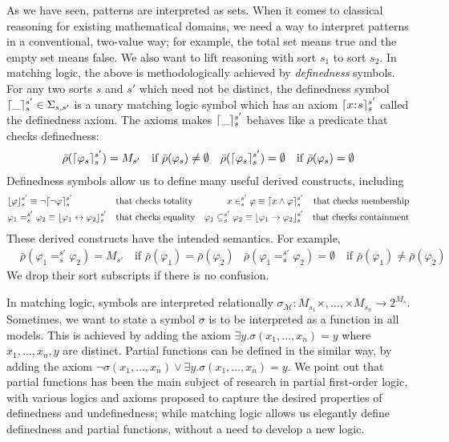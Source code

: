 \documentclass[letter,12pt]{article}
\newcommand{\imp}{\to}
\newcommand{\dimp}{\leftrightarrow}
\newcommand{\ddd}{,\dots,}
\newcommand{\cln}{\mathbin{\!:\!}}
\newcommand{\MM}{\mathcal{M}}
\newcommand{\sigmaM}{{\sigma_{\MM}}}
\newcommand{\SigmaSub}[1]{\Sigma_{#1}}
\newcommand{\barrho}{\bar{\rho}}
\DeclarePairedDelimiter{\ceil}{\lceil}{\rceil}
\DeclarePairedDelimiter{\floor}{\lfloor}{\rfloor}
\begin{document}
As we have seen, patterns are interpreted as sets.
When it comes to classical reasoning for existing mathematical domains,
we need a way to interpret patterns in a conventional, two-value way;
for example, the total set means true and the empty set means false.
We also want to lift reasoning with sort $s_1$ to sort $s_2$.
In matching logic, the above is methodologically achieved by
\emph{definedness} symbols.
For any two sorts $s$ and $s'$ which need not be distinct, 
the definedness symbol
$\ceil{\_}_{s}^{s'} \in \SigmaSub{s,s'}$
is a unary matching logic symbol which has an axiom
$
\ceil{x \cln s}_{s}^{s'}
$
called the definedness axiom. 
The axioms makes $\ceil{\_}_{s}^{s'}$ behaves like a predicate
that checks definedness:
\begin{align*}
& \barrho(\ceil{\varphi_s}_{s}^{s'}) = M_{s'}
  \quad \text{if $\barrho(\varphi_s) \neq \emptyset$}
& \barrho(\ceil{\varphi_s}_{s}^{s'}) = \emptyset
  \quad \text{if $\barrho(\varphi_s) = \emptyset$}
\end{align*}
Definedness symbols allow us to define many useful derived constructs, including
\begin{align*}
&\floor{\varphi}_s^{s'} \equiv \neg \ceil{\neg \varphi}_s^{s'}
&& \text{that checks totality}
&x \in_s^{s'} \varphi \equiv \ceil{x \wedge \varphi}_s^{s'}
&& \text{that checks membership}
\\
&\varphi_1 =_s^{s'} \varphi_2 \equiv \floor{\varphi_1 \dimp \varphi_2}_s^{s'}
&& \text{that checks equality}
&\varphi_1 \subseteq_s^{s'} \varphi_2 
\equiv \floor{\varphi_1 \imp \varphi_2}_s^{s'}
&& \text{that checks containment}
\end{align*}
These derived constructs have the intended semantics.
For example,
\begin{align*}
& \barrho(\varphi_1 =_{s}^{s'} \varphi_2) = M_{s'}
  \quad \text{if $\barrho(\varphi_1) = \barrho(\varphi_2)$}
& \barrho(\varphi_1 =_{s}^{s'} \varphi_2) = \emptyset
  \quad \text{if $\barrho(\varphi_1) \neq \barrho(\varphi_2)$}
\end{align*}
We drop their sort subscripts if there is no confusion.

In matching logic, symbols are interpreted relationally
$\sigmaM \colon M_{s_1} \times \ddd \times M_{s_n} \to 2^{M_s}$.
Sometimes, we want to state a symbol $\sigma$ is to be interpreted
as a function in all models.
This is achieved by adding the axiom
$\exists y . \sigma(x_1 \ddd x_n) = y$
where $x_1 \ddd x_n , y$ are distinct.
Partial functions can be defined in the similar way, by adding the axiom
$\neg \sigma(x_1 \ddd x_n) \vee \exists y . \sigma(x_1 \ddd x_n) = y$.
We point out that partial functions has been the main subject of research
in partial first-order logic, with various logics and axioms proposed
to capture the desired properties of definedness and undefinedness;
while matching logic allows us elegantly define definedness and partial 
functions, without a need to develop a new logic.
\end{document}
